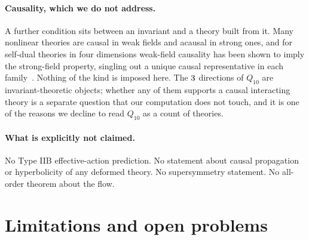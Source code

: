 \documentclass[11pt,a4paper]{article}
\theoremstyle{definition}
\theoremstyle{remark}
\newcommand{\Qten}{Q_{10}}
\begin{document}
\paragraph{Causality, which we do not address.}
A further condition sits between an invariant and a theory built from it.
Many nonlinear theories are causal in weak fields and acausal in strong ones,
and for self-dual theories in four dimensions weak-field causality has been
shown to imply the strong-field property, singling out a unique causal
representative in each family~\cite{Russo:2024kto}. Nothing of the kind is
imposed here. The $3$ directions of $\Qten$ are invariant-theoretic
objects; whether any of them supports a causal interacting theory is a separate
question that our computation does not touch, and it is one of the reasons we
decline to read $\Qten$ as a count of theories.

\paragraph{What is explicitly not claimed.}
No Type IIB effective-action prediction. No statement about causal propagation or
hyperbolicity of any deformed theory. No supersymmetry statement. No all-order
theorem about the flow.

\section{Limitations and open problems}
\label{sec:limitations}
\end{document}

